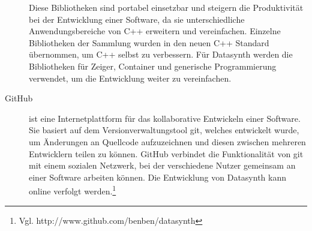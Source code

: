 \documentclass[a4paper, 
               12pt,
               DIV=calc,
               version=first,
               pdftex,
               headsepline,
               footsepline,
               bibtotocnumbered,
               liststotocnumbered]{scrreprt}
\begin{document}
\begin{description}
Diese Bibliotheken sind portabel einsetzbar und steigern die
Produktivität bei der Entwicklung einer Software, da sie unterschiedliche
Anwendungsbereiche von C++ erweitern und vereinfachen.
Einzelne Bibliotheken der Sammlung wurden in den neuen C++ Standard
übernommen, um C++ selbst zu verbessern.
Für Datasynth werden die Bibliotheken für Zeiger, Container
und generische Programmierung verwendet, um die Entwicklung weiter zu vereinfachen.
\item[GitHub]
ist eine Internetplattform für das kollaborative Entwickeln einer Software.
Sie basiert auf dem Versionverwaltungstool git, welches entwickelt wurde,
um Änderungen an Quellcode aufzuzeichnen und diesen zwischen mehreren
Entwicklern teilen zu können. GitHub verbindet die Funktionalität von git mit
einem sozialen Netzwerk, bei der verschiedene Nutzer gemeinsam
an einer Software arbeiten können. Die Entwicklung von Datasynth kann online 
verfolgt werden.\footnote{Vgl. http://www.github.com/benben/datasynth}
\end{description}
\end{document}
